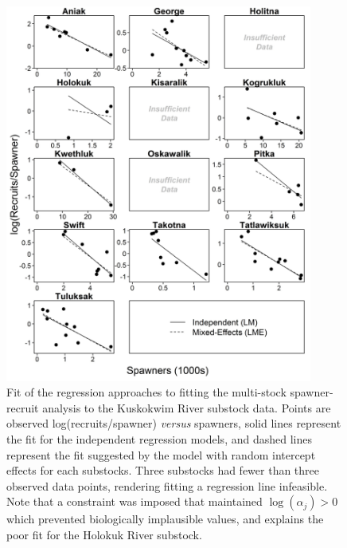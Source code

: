 \documentclass[12pt,]{book}
\theoremstyle{definition}
\theoremstyle{definition}
\theoremstyle{definition}
\theoremstyle{remark}
\begin{document}
\clearpage

\begin{figure}
  \centering
  \includegraphics[width=0.9\textwidth]{img/Ch4/RPS-v-S.jpg}
  \caption{Fit of the regression approaches to fitting the multi-stock spawner-recruit analysis to the Kuskokwim River substock data. Points are observed log(recruits/spawner) \textit{versus} spawners, solid lines represent the fit for the independent regression models, and dashed lines represent the fit suggested by the model with random intercept effects for each substocks. Three substocks had fewer than three observed data points, rendering fitting a regression line infeasible. Note that a constraint was imposed that maintained $\log(\alpha_{j}) > 0$ which prevented biologically implausible values, and explains the poor fit for the Holokuk River substock.}
  \label{fig:rps-v-s}
\end{figure}

\clearpage
\end{document}
